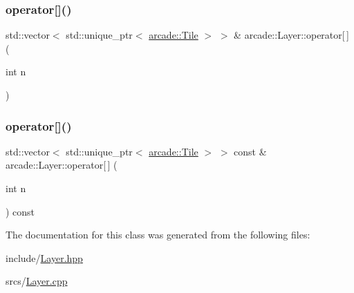 \subsubsection{\texorpdfstring{operator[]()}{operator[]()}\hspace{0.1cm}{\footnotesize\ttfamily [1/2]}}
{\footnotesize\ttfamily std\+::vector$<$ std\+::unique\+\_\+ptr$<$ \hyperlink{classarcade_1_1_tile}{arcade\+::\+Tile} $>$ $>$ \& arcade\+::\+Layer\+::operator\mbox{[}$\,$\mbox{]} (\begin{DoxyParamCaption}\item[{int}]{n }\end{DoxyParamCaption})}

\mbox{\label{classarcade_1_1_layer_a9067055ced1434f349f17767d77a9e6d}} 
\subsubsection{\texorpdfstring{operator[]()}{operator[]()}\hspace{0.1cm}{\footnotesize\ttfamily [2/2]}}
{\footnotesize\ttfamily std\+::vector$<$ std\+::unique\+\_\+ptr$<$ \hyperlink{classarcade_1_1_tile}{arcade\+::\+Tile} $>$ $>$ const  \& arcade\+::\+Layer\+::operator\mbox{[}$\,$\mbox{]} (\begin{DoxyParamCaption}\item[{int}]{n }\end{DoxyParamCaption}) const}



The documentation for this class was generated from the following files\+:\begin{DoxyCompactItemize}
\item 
include/\hyperlink{_layer_8hpp}{Layer.\+hpp}\item 
srcs/\hyperlink{_layer_8cpp}{Layer.\+cpp}\end{DoxyCompactItemize}
